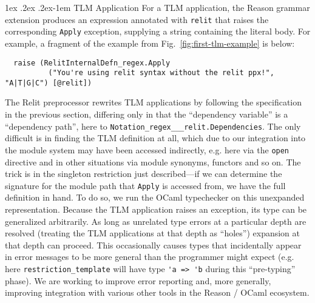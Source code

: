 \documentclass[acmsmall]{acmart}
\makeatletter
\renewcommand{\paragraph}{%
  \@startsection{paragraph}{4}%
  {\z@}{1ex \@plus .2ex \@minus .2ex}{-1em}%
  {\normalfont\normalsize\bfseries}%
}
\newcommand{\li}[1]{\lstinline[basicstyle=\ttfamily\fontsize{9pt}{1em}\selectfont]{#1}}
\makeatother
\begin{document}

\paragraph{TLM Application} For a TLM application, the Reason grammar extension produces an expression annotated with \li{relit} that raises the corresponding \li{Apply} exception, supplying a string containing the literal body. For example, a fragment of the example from Fig.~\ref{fig:first-tlm-example} is below:
\begin{lstlisting}
  raise (RelitInternalDefn_regex.Apply
          ("You're using relit syntax without the relit ppx!", "A|T|G|C") [@relit])
\end{lstlisting}

The Relit preprocessor rewrites TLM applications by following the specification in the previous section, differing only in that the ``dependency variable'' is a ``dependency path'', here to \li{Notation_regex___relit.Dependencies}. The only difficult is in finding the TLM definition at all, which due to our integration into the module system may have been accessed indirectly, e.g. here via the \li{open} directive and in other situations via module synonyms, functors and so on. The trick is in the singleton restriction just described---if we can determine the signature for the module path that \li{Apply} is accessed from, we have the full definition in hand. To do so, we run the OCaml typechecker on this unexpanded representation. Because the TLM application raises an exception, its type can be generalized arbitrarily. As long as unrelated type errors at a particular depth are resolved (treating the TLM applications at that depth as ``holes'') expansion at that depth can proceed. This occasionally causes types that incidentally appear in error messages to be more general than the programmer might expect (e.g. here \li{restriction_template} will have type \li{'a => 'b} during this ``pre-typing'' phase). 
We are working to improve error reporting and, more generally, improving integration with various other tools in the Reason / OCaml ecosystem.
\end{document}
